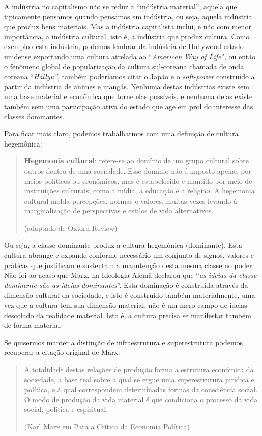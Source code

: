 A indústria no capitalismo não se reduz a “indústria material”, aquela que tipicamente pensamos quando pensamos em indústria, ou seja, aquela indústria que produz bens materiais. Mas a indústria capitalista inclui, e não com menor importância, a indústria cultural, isto é, a indústria que produz  cultura. Como exemplo desta indústria, podemos lembrar da indústria de Hollywood estado-unidense exportando uma cultura atrelada ao “\textit{American Way of Life}”, ou então o fenômeno global de popularização da cultura sul-coreana chamada de onda coreana “\textit{Hallyu”}, também poderíamos citar o Japão e o \textit{soft-power} construído a partir da indústria de animes e mangás. Nenhuma destas indústrias existe sem uma base material e econômica que torne elas possíveis, e nenhuma delas existe também sem uma participação ativa do estado que age em prol do interesse das classes dominantes.

Para ficar mais claro, podemos trabalharmos com uma definição de cultura hegemônica:

\begin{quote}
\textbf{Hegemonia cultural}: refere-se ao domínio de um grupo cultural sobre outros dentro de uma sociedade. Esse domínio não é imposto apenas por meios políticos ou econômicos, mas é estabelecido e mantido por meio de instituições culturais, como a mídia, a educação e a religião. A hegemonia cultural molda percepções, normas e valores, muitas vezes levando à marginalização de perspectivas e estilos de vida alternativos.

(adaptado de Oxford Review)
\end{quote}

Ou seja, a classe dominante produz a cultura hegemônica (dominante). Esta cultura abrange e expande conforme necessário um conjunto de signos, valores e práticas que justificam e sustentam a manutenção desta mesma classe no poder. Não foi ao acaso que Marx, na Ideologia Alemã declarou que “\textit{as ideias da classe dominante são as ideias dominantes}”. Esta dominação é construída através da dimensão cultural da sociedade, e isto é construído também materialmente, uma vez que a cultura tem sua dimensão material, não é um mero campo de ideias descolado da realidade material. Isto é, a cultura precisa se manifestar também de forma material.

Se quisermos manter a distinção de infraestrutura e superestrutura podemos recuperar a citação original de Marx:

\begin{quote}
A totalidade destas relações de produção forma a estrutura económica da sociedade, a base real sobre a qual se ergue uma superestrutura jurídica e política, e à qual correspondem determinadas formas da consciência social. O modo de produção da vida material é que condiciona o processo da vida social, política e espiritual.

(Karl Marx em Para a Crítica da Economia Política)
\end{quote}

